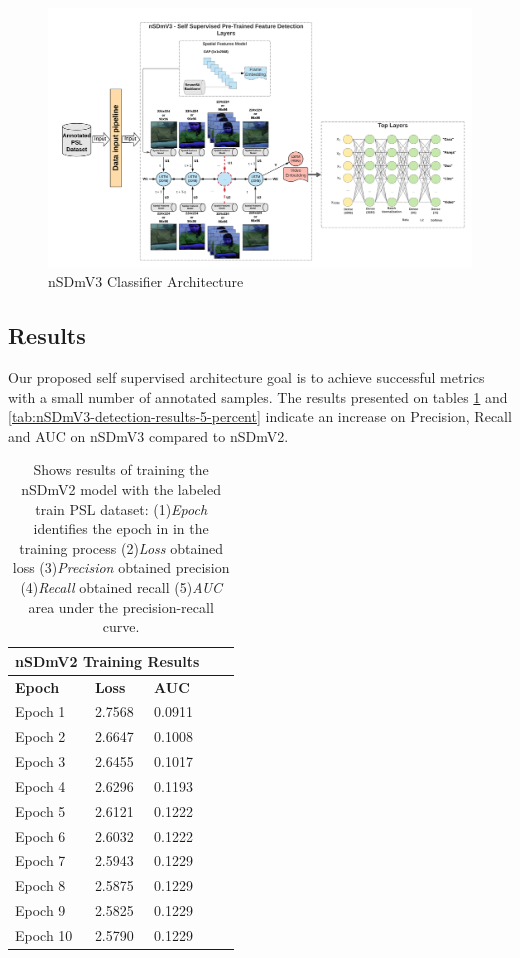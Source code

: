\documentclass[twocolumn,conference]{article}
\begin{document}
\begin{figure}[hbt!]
\includegraphics[width=\textwidth,height=\textheight,keepaspectratio]{images/nsdmv3-classifier-architecture.png}
\caption{nSDmV3 Classifier Architecture}
\label{fig:nsdmv3-classifier-architecture}
\end{figure}

\subsection{Results}\label{results}
Our proposed self supervised architecture goal is to achieve successful metrics with a small number of annotated samples. The results presented on tables \ref{tab:nSDmV2-detection-results-5-percent} and \ref{tab:nSDmV3-detection-results-5-percent} indicate an increase on Precision, Recall and AUC on nSDmV3 compared to nSDmV2.

\begin{table}
\captionsetup{font=footnotesize}
\centering
\begin{tabular}{ p{2.8cm} p{2.8cm} p{2.8cm} p{2.8cm} p{2.8cm} }
\toprule
\multicolumn{3}{c}{\textbf{nSDmV2 Training Results}} \\
\hline
\hline
\textbf{Epoch}&	\textbf{Loss}		&\textbf{AUC} \\
\hline
\midrule
Epoch 1&	2.7568&	0.0911\\
Epoch 2&	2.6647&	0.1008\\
Epoch 3&	2.6455&	0.1017\\
Epoch 4&	2.6296&	0.1193\\
Epoch 5&	2.6121&	0.1222\\
Epoch 6&	2.6032&	0.1222\\
Epoch 7&	2.5943&	0.1229\\
Epoch 8&	2.5875&	0.1229\\
Epoch 9&	2.5825&	0.1229\\
Epoch 10&	2.5790&	0.1229\\
\bottomrule
\end{tabular}
\caption{Shows results of training the nSDmV2 model with the labeled train PSL dataset: (1)\textit{Epoch} identifies the epoch in in the training process (2)\textit{Loss} obtained loss (3)\textit{Precision} obtained precision (4)\textit{Recall} obtained recall (5)\textit{AUC} area under the precision-recall curve.}
\label{tab:nSDmV2-detection-results-5-percent}
\end{table}
\end{document}
